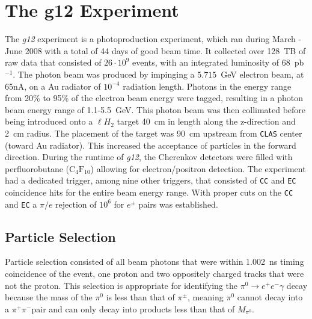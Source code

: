 \documentclass{aip-cp}
\def\g12{\emph{g12}}
\newcommand{\abbr}[1]{\textsc{\texttt{#1}}}
\begin{document}
\section{The g12 Experiment}
The \g12 experiment is a photoproduction experiment, which ran during March - June 2008 with a total of 44 days of good beam time. It collected over 128~TB of raw data that consisted of $26\cdot 10^9$ events, with an integrated luminosity of 68~pb$^{-1}$. The photon beam was produced by impinging a $5.715$~GeV electron beam, at 65nA, on a Au radiator of $10^{-4}$ radiation length. Photons in the energy range from 20\% to 95\% of the electron beam
energy were tagged, resulting in a photon beam energy range of 1.1-5.5~GeV. This photon beam was then collimated before being introduced onto a $\ell H_2$ target 40~cm in length along the z-direction and 2~cm radius. The placement of the target was 90~cm upstream from \abbr{CLAS} center (toward Au radiator). This increased the acceptance of particles in the forward direction. During the runtime of \g12, the Cherenkov detectors were filled with perfluorobutane ($\mathrm{C_4F_{10}}$) allowing for electron/positron detection. The experiment had a dedicated trigger, among nine other triggers, that consisted of \abbr{CC} and \abbr{EC} coincidence hits for the entire beam energy range. With proper cuts on the \abbr{CC} and \abbr{EC} a $\pi/e$ rejection of $10^6$ for $e^{\pm}$ pairs was established.
\subsection{Particle Selection}
Particle selection consisted of all beam photons that were within 1.002~ns timing coincidence of the event, one proton and two oppositely charged tracks that were not the proton. This selection is appropriate for identifying the $\pi^0 \to e^+e^-\gamma$ decay because the mass of the $\pi^0$ is less than that of $\pi^{\pm}$, meaning $\pi^0$ cannot decay into a $\pi^{+}\pi^{-}$pair and can only decay into products less than that of $M_{\pi^0}$.
\end{document}
